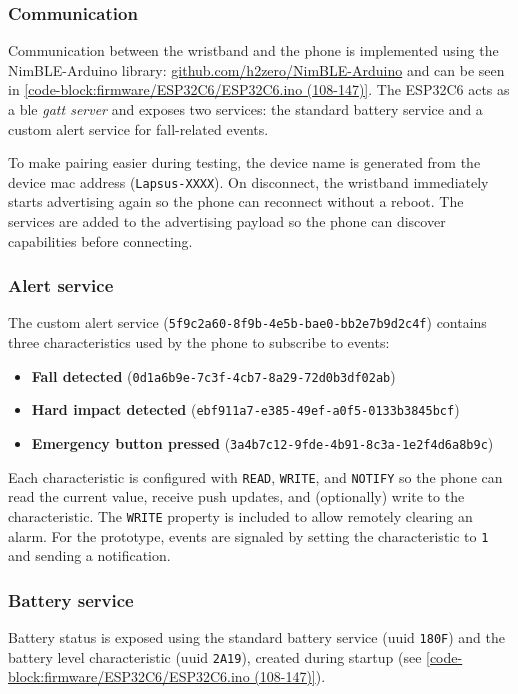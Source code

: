 \subsubsection{Communication}
Communication between the wristband and the phone is implemented using the NimBLE-Arduino library: \href{https://github.com/h2zero/NimBLE-Arduino}{github.com/h2zero/NimBLE-Arduino} and can be seen in \autoref{code-block:firmware/ESP32C6/ESP32C6.ino (108-147)}. The ESP32C6 acts as a \gls{ble} \textit{\gls{gatt} server} and exposes two services: the standard battery service and a custom alert service for fall-related events. 

To make pairing easier during testing, the device name is generated from the device \gls{mac} address (\verb|Lapsus-XXXX|). On disconnect, the wristband immediately starts advertising again so the phone can reconnect without a reboot. The services are added to the advertising payload so the phone can discover capabilities before connecting.


\subsubsection{Alert service}
The custom alert service (\verb|5f9c2a60-8f9b-4e5b-bae0-bb2e7b9d2c4f|) contains three characteristics used by the phone to subscribe to events:
\begin{itemize}
    \item \textbf{Fall detected} (\verb|0d1a6b9e-7c3f-4cb7-8a29-72d0b3df02ab|)
    \item \textbf{Hard impact detected} (\verb|ebf911a7-e385-49ef-a0f5-0133b3845bcf|)
    \item \textbf{Emergency button pressed} (\verb|3a4b7c12-9fde-4b91-8c3a-1e2f4d6a8b9c|)
\end{itemize}

Each characteristic is configured with \verb|READ|, \verb|WRITE|, and \verb|NOTIFY| so the phone can read the current value, receive push updates, and (optionally) write to the characteristic. The \verb|WRITE| property is included to allow remotely clearing an alarm. For the prototype, events are signaled by setting the characteristic to \verb|1| and sending a notification.

\subsubsection{Battery service}
Battery status is exposed using the standard battery service (\gls{uuid} \verb|180F|) and the battery level characteristic (\gls{uuid} \verb|2A19|), created during startup (see \autoref{code-block:firmware/ESP32C6/ESP32C6.ino (108-147)}).

